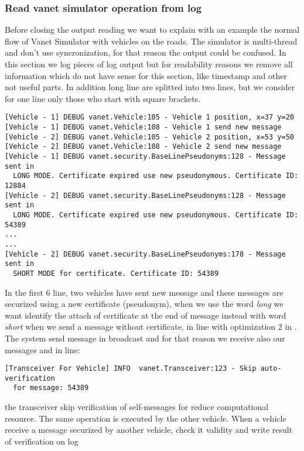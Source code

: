 \subsubsection{Read vanet simulator operation from log}
Before closing the output reading we want to explain with an example the normal flow of Vanet Simulator with vehicles on the roads. The simulator is multi-thread and don't use syncronization, for that reason the output could be confused. In this section we log pieces of log output but for readability reasons we remove all information which do not have sense for this section, like timestamp and other not useful parts. In addition long line are splitted into two lines, but we consider for one line only those who start with square brackets.\\
\begin{verbatim}
[Vehicle - 1] DEBUG vanet.Vehicle:105 - Vehicle 1 position, x=37 y=20
[Vehicle - 1] DEBUG vanet.Vehicle:108 - Vehicle 1 send new message
[Vehicle - 2] DEBUG vanet.Vehicle:105 - Vehicle 2 position, x=53 y=50
[Vehicle - 2] DEBUG vanet.Vehicle:108 - Vehicle 2 send new message
[Vehicle - 1] DEBUG vanet.security.BaseLinePseudonyms:128 - Message sent in 
  LONG MODE. Certificate expired use new pseudonymous. Certificate ID: 12884
[Vehicle - 2] DEBUG vanet.security.BaseLinePseudonyms:128 - Message sent in 
  LONG MODE. Certificate expired use new pseudonymous. Certificate ID: 54389
...
...
[Vehicle - 2] DEBUG vanet.security.BaseLinePseudonyms:178 - Message sent in 
  SHORT MODE for certificate. Certificate ID: 54389
\end{verbatim}
In the first 6 line, two vehicles have sent new message and these messages are securized using a new certificate (pseudonym), when we use the word \textit{long} we want identify the attach of certificate at the end of message instead with word \textit{short} when we send a message without certificate, in line with optimization 2 in \cite{calandriello}.\\
The system send message in broadcast and for that reason we receive also our messages and in line:
\begin{verbatim}
[Transceiver For Vehicle] INFO  vanet.Transceiver:123 - Skip auto-verification 
  for message: 54389
\end{verbatim}
the transceiver skip verification of self-messages for reduce computational resource. The same operation is executed by the other vehicle. When a vehicle receive a message securized by another vehicle, check it validity and write result of verification on log
